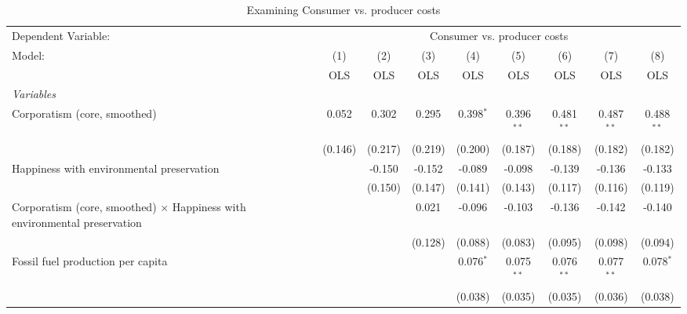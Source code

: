 
\begin{table}[htbp]
   \caption{Examining Consumer vs. producer costs}
   \centering
   \begin{tabular}{lcccccccc}
      \toprule
      Dependent Variable: & \multicolumn{8}{c}{Consumer vs. producer costs}\\
      Model:                                                                           & (1)     & (2)     & (3)     & (4)         & (5)          & (6)          & (7)          & (8)\\  
                                                                                       &  OLS    & OLS     & OLS     & OLS         & OLS          & OLS          & OLS          & OLS\\  
      \midrule
      \emph{Variables}\\
      Corporatism (core, smoothed)                                                     & 0.052   & 0.302   & 0.295   & 0.398$^{*}$ & 0.396$^{**}$ & 0.481$^{**}$ & 0.487$^{**}$ & 0.488$^{**}$\\   
                                                                                       & (0.146) & (0.217) & (0.219) & (0.200)     & (0.187)      & (0.188)      & (0.182)      & (0.182)\\   
      Happiness with environmental preservation                                        &         & -0.150  & -0.152  & -0.089      & -0.098       & -0.139       & -0.136       & -0.133\\   
                                                                                       &         & (0.150) & (0.147) & (0.141)     & (0.143)      & (0.117)      & (0.116)      & (0.119)\\   
      Corporatism (core, smoothed) $\times$ Happiness with environmental preservation  &         &         & 0.021   & -0.096      & -0.103       & -0.136       & -0.142       & -0.140\\   
                                                                                       &         &         & (0.128) & (0.088)     & (0.083)      & (0.095)      & (0.098)      & (0.094)\\   
      Fossil fuel production per capita                                                &         &         &         & 0.076$^{*}$ & 0.075$^{**}$ & 0.076$^{**}$ & 0.077$^{**}$ & 0.078$^{*}$\\   
                                                                                       &         &         &         & (0.038)     & (0.035)      & (0.035)      & (0.036)      & (0.038)\\   

\end{tabular}
\end{table}
